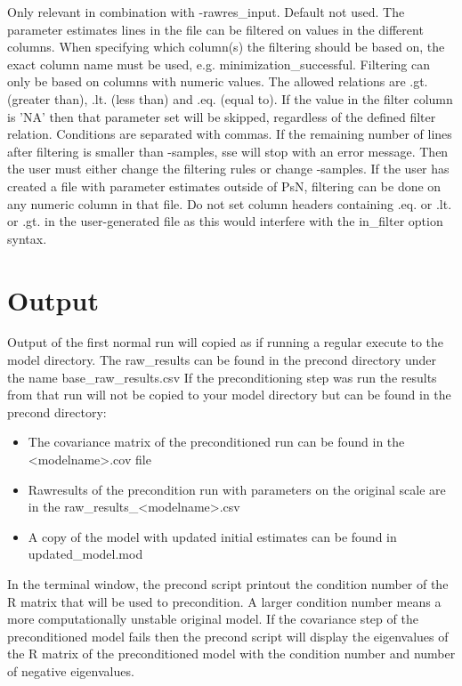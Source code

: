 \begin{optionlist}
\nextopt
{}
Only relevant in combination with -rawres\_input. Default not used. The parameter estimates lines in the file can be filtered on values in the different columns. When specifying which column(s) the filtering should be based on, the exact column name must be used, e.g. minimization\_successful. Filtering can only be based on columns with numeric values. The allowed relations are .gt. (greater than), .lt. (less than) and .eq. (equal to). If the value in the filter column is 'NA' then that parameter set will be skipped, regardless of the defined filter relation. Conditions are separated with commas. If the remaining number of lines after filtering is smaller than -samples, sse will stop with an error message. Then the user must either change the filtering rules or change -samples. If the user has created a file with parameter estimates outside of PsN, filtering can be done on any numeric column in that file. Do not set column headers containing .eq. or .lt. or .gt. in the user-generated file as this would interfere with the in\_filter option syntax.
\nextopt
\end{optionlist}

\section{Output}
Output of the first normal run will copied as if running a regular execute to the model directory. The raw\_results can be found
in the precond directory under the name base\_raw\_results.csv
If the preconditioning step was run the results from that run will not be copied to your model directory but can be found
in the precond directory:

\begin{itemize}
    \item The covariance matrix of the preconditioned run can be found in the <modelname>.cov file
    \item Rawresults of the precondition run with parameters on the original scale are in the raw\_results\_<modelname>.csv
    \item A copy of the model with updated initial estimates can be found in updated\_model.mod
\end{itemize}
 

In the terminal window, the precond script printout the condition number of the R matrix that will be used to precondition.  A larger condition number means a more computationally unstable original model. If the covariance step of the preconditioned model fails then the precond script will display the eigenvalues of the R matrix of the preconditioned model with the condition number and number of negative eigenvalues.  

